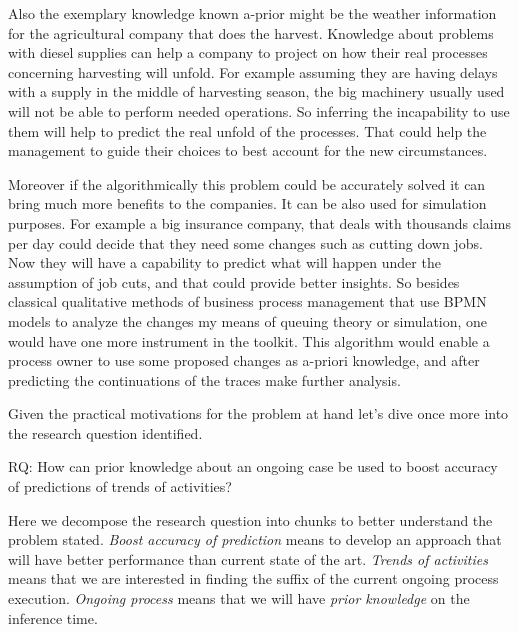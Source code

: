Also the exemplary knowledge known a-prior might be the weather information for the agricultural company that does the harvest. Knowledge about problems with diesel supplies can help a company to project on how their real processes concerning harvesting will unfold. For example assuming they are having delays with a supply in the middle of harvesting season, the big machinery usually used will not be able to perform needed operations. So inferring the incapability to use them will help to predict the real unfold of the processes. That could help the management to guide their choices to best account for the new circumstances. 


Moreover if the algorithmically this problem could be accurately solved it can bring much more benefits to the companies. It can be also used for simulation purposes. For example a big insurance company, that deals with thousands claims per day could decide that they need some changes such as cutting down jobs. Now they will have a capability to predict what will happen under the assumption of job cuts, and that could provide better insights. So besides classical qualitative methods of business process management that use BPMN models to analyze the changes my means of queuing theory or simulation, one would have one more instrument in the toolkit. This algorithm would enable a process owner to use some proposed changes as a-priori knowledge, and after predicting the continuations of the traces make further analysis. 

Given the practical motivations for the problem at hand let's dive once more into the research question identified.

RQ: How can prior knowledge about an ongoing case be used to boost accuracy of predictions of trends of activities?

Here we decompose the research question into chunks to better understand the problem stated. \textit{Boost accuracy of prediction} means to develop an approach that will have better performance than current state of the art. \textit{Trends of activities} means that we are interested in finding the suffix of the current ongoing process execution. \textit{Ongoing process} means that we will have \textit{prior knowledge} on the inference time. 





